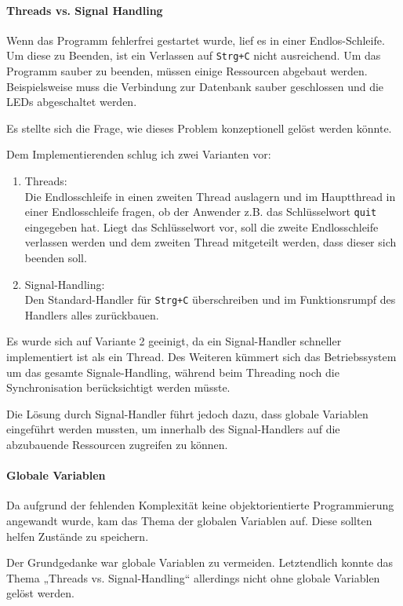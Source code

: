 \paragraph{Threads vs. Signal Handling}
Wenn das Programm fehlerfrei gestartet wurde, lief es in einer Endlos-Schleife. Um diese zu Beenden, ist ein Verlassen auf \texttt{Strg+C} nicht ausreichend. Um das Programm sauber zu beenden, müssen einige Ressourcen abgebaut werden. Beispielsweise muss die Verbindung zur Datenbank sauber geschlossen und die LEDs abgeschaltet werden.

Es stellte sich die Frage, wie dieses Problem konzeptionell gelöst werden könnte. 

Dem Implementierenden schlug ich zwei Varianten vor:
\begin{enumerate}
    \item Threads:\\
    Die Endlosschleife in einen zweiten Thread auslagern und im Hauptthread in einer Endlosschleife fragen, ob der Anwender z.B. das Schlüsselwort \texttt{quit} eingegeben hat. Liegt das Schlüsselwort vor, soll die zweite Endlosschleife verlassen werden und dem zweiten Thread mitgeteilt werden, dass dieser sich beenden soll.
    \item Signal-Handling:\\
    Den Standard-Handler für \texttt{Strg+C} überschreiben und im Funktionsrumpf des Handlers alles zurückbauen.
\end{enumerate}
Es wurde sich auf Variante 2 geeinigt, da ein Signal-Handler schneller implementiert ist als ein Thread. Des Weiteren kümmert sich das Betriebssystem um das gesamte Signale-Handling, während beim Threading noch die Synchronisation berücksichtigt werden müsste.

Die Lösung durch Signal-Handler führt jedoch dazu, dass globale Variablen eingeführt werden mussten, um innerhalb des Signal-Handlers auf die abzubauende Ressourcen zugreifen zu können.
\paragraph{Globale Variablen}
Da aufgrund der fehlenden Komplexität keine objektorientierte Programmierung angewandt wurde, kam das Thema der globalen Variablen auf. Diese sollten helfen Zustände zu speichern.

Der Grundgedanke war globale Variablen zu vermeiden. Letztendlich konnte das Thema „Threads vs. Signal-Handling“ allerdings nicht ohne globale Variablen gelöst werden. 
